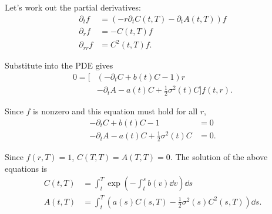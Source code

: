 \documentclass[square]{article} %
\theoremstyle{plain}
\theoremstyle{definition} %
\begin{document}
Let's work out the partial derivatives:
\begin{align*}
  \partial_t f &= \left(-r \partial_t C(t,T) - \partial_t A(t,T)\right) f\\
  \partial_r f &= -C(t,T)f\\
  \partial_{rr} f &= C^2(t,T)f.
\end{align*}

Substitute into the PDE gives
\begin{align*}
0=\Big[
&\left(
-\partial_t C+ b(t)C-1
\right)r\\
&-\partial_t A - a(t)C+\frac{1}{2}\sigma^2(t)C
\Big]f(t,r).
\end{align*}
 
Since $f$ is nonzero and this equation must hold for all $r$, 
\begin{align*}
  -\partial_t C+ b(t)C-1 &=0\\
  -\partial_t A - a(t)C+\frac{1}{2}\sigma^2(t)C &=0.
\end{align*}

Since $f(r,T)=1$, $C(T,T)=A(T,T)=0$. The solution of the above equations is 
\begin{align*}
  C(t,T) &= \int_t^T \exp\left(-\int_t^s b(v)\dd v\right)\dd s\\
  A(t,T) &= \int_t^T \left(a(s) C(s,T)-\frac{1}{2}\sigma^2(s)C^2(s,T)\right)\dd s.
\end{align*}


\end{document}
